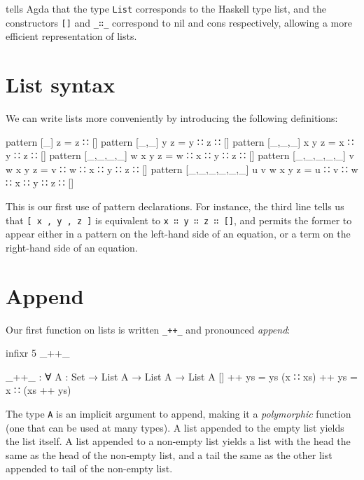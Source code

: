 tells Agda that the type \texttt{List} corresponds to the Haskell type
list, and the constructors \texttt{{[}{]}} and \texttt{\_∷\_} correspond
to nil and cons respectively, allowing a more efficient representation
of lists.

\hypertarget{list-syntax}{%
\section{List syntax}\label{list-syntax}}

We can write lists more conveniently by introducing the following
definitions:

\begin{fence}
\begin{code}
pattern [_] z = z ∷ []
pattern [_,_] y z = y ∷ z ∷ []
pattern [_,_,_] x y z = x ∷ y ∷ z ∷ []
pattern [_,_,_,_] w x y z = w ∷ x ∷ y ∷ z ∷ []
pattern [_,_,_,_,_] v w x y z = v ∷ w ∷ x ∷ y ∷ z ∷ []
pattern [_,_,_,_,_,_] u v w x y z = u ∷ v ∷ w ∷ x ∷ y ∷ z ∷ []
\end{code}
\end{fence}

This is our first use of pattern declarations. For instance, the third
line tells us that \texttt{{[}\ x\ ,\ y\ ,\ z\ {]}} is equivalent to
\texttt{x\ ∷\ y\ ∷\ z\ ∷\ {[}{]}}, and permits the former to appear
either in a pattern on the left-hand side of an equation, or a term on
the right-hand side of an equation.

\hypertarget{append}{%
\section{Append}\label{append}}

Our first function on lists is written \texttt{\_++\_} and pronounced
\emph{append}:

\begin{fence}
\begin{code}
infixr 5 _++_

_++_ : ∀ {A : Set} → List A → List A → List A
[]       ++ ys  =  ys
(x ∷ xs) ++ ys  =  x ∷ (xs ++ ys)
\end{code}
\end{fence}

The type \texttt{A} is an implicit argument to append, making it a
\emph{polymorphic} function (one that can be used at many types). A list
appended to the empty list yields the list itself. A list appended to a
non-empty list yields a list with the head the same as the head of the
non-empty list, and a tail the same as the other list appended to tail
of the non-empty list.

